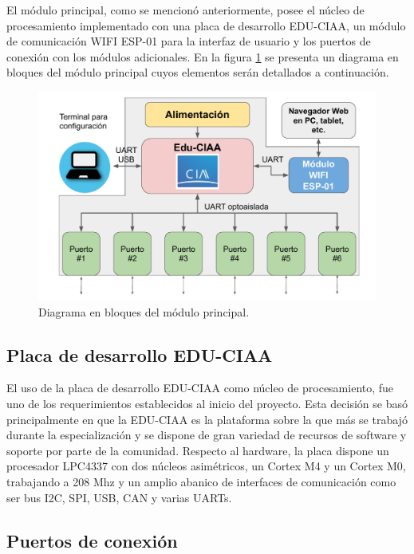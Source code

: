 El módulo principal, como se mencionó anteriormente, posee el núcleo de procesamiento implementado con una placa de desarrollo EDU-CIAA, un módulo de comunicación WIFI ESP-01 para la interfaz de usuario y los puertos de conexión con los módulos adicionales. En la figura \ref{fig:BloquesPrincipal} se presenta un diagrama en bloques del módulo principal cuyos elementos serán detallados a continuación.

\begin{figure}[H]
	\centering
	\includegraphics[width=1\textwidth]{./Figures/bloquesPrincipal.pdf}
	\caption{Diagrama en bloques del módulo principal.}
	\label{fig:BloquesPrincipal}
\end{figure}



\subsection{Placa de desarrollo EDU-CIAA}

El uso de la placa de desarrollo EDU-CIAA como núcleo de procesamiento, fue uno de los requerimientos establecidos al inicio del proyecto. Esta decisión se basó principalmente en que la EDU-CIAA es la plataforma sobre la que más se trabajó durante la especialización y se dispone de gran variedad de recursos de software y soporte por parte de la comunidad. 
Respecto al hardware, la placa dispone un procesador LPC4337 con dos núcleos asimétricos, un Cortex M4 y un Cortex M0, trabajando a 208 Mhz y un amplio abanico de interfaces de comunicación como ser bus I2C, SPI, USB, CAN y varias UARTs. 


\subsection{Puertos de conexión}
\label{sec:puertos}

